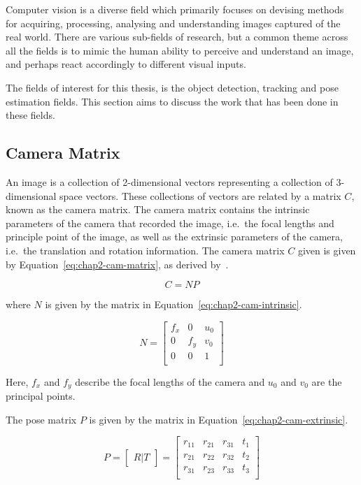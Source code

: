 Computer vision is a diverse field which primarily focuses on devising methods for acquiring, processing, analysing and understanding images captured of the real world. There are various sub-fields of research, but a common theme across all the fields is to mimic the human ability to perceive and understand an image, and perhaps react accordingly to different visual inputs. 

The fields of interest for this thesis, is the object detection, tracking and pose estimation fields. This section aims to discuss the work that has been done in these fields. 

\subsection{Camera Matrix}

An image is a collection of 2-dimensional vectors representing a collection of 3-dimensional space vectors. These collections of vectors are related by a matrix $C$, known as the camera matrix. The camera matrix contains the intrinsic parameters of the camera that recorded the image, i.e.\ the focal lengths and principle point of the image, as well as the extrinsic parameters of the camera, i.e.\ the translation and rotation information. The camera matrix $C$ given is given by Equation~\ref{eq:chap2-cam-matrix}, as derived by~\cite{heikkila1997four}. 

\begin{equation}
  \label{eq:chap2-cam-matrix}
  C = 
  NP
\end{equation}

where $N$ is given by the matrix in Equation~\ref{eq:chap2-cam-intrinsic}.

\begin{equation}
  \label{eq:chap2-cam-intrinsic}
  N = 
  \begin{bmatrix}
    f_x & 0   & u_0 \\
    0   & f_y & v_0 \\
    0   & 0   & 1   \\
  \end{bmatrix}
\end{equation}

Here, $f_x$ and $f_y$ describe the focal lengths of the camera and $u_0$ and $v_0$ are the principal points. 

The pose matrix $P$ is given by the matrix in Equation~\ref{eq:chap2-cam-extrinsic}.

\begin{equation}
  \label{eq:chap2-cam-extrinsic}
  P = 
  \begin{bmatrix}
    R | T
  \end{bmatrix}
  =
  \begin{bmatrix}
    r_{11} & r_{21} & r_{31} & t_1 \\
    r_{21} & r_{22} & r_{32} & t_2 \\
    r_{31} & r_{23} & r_{33} & t_3 \\
  \end{bmatrix}
\end{equation}

